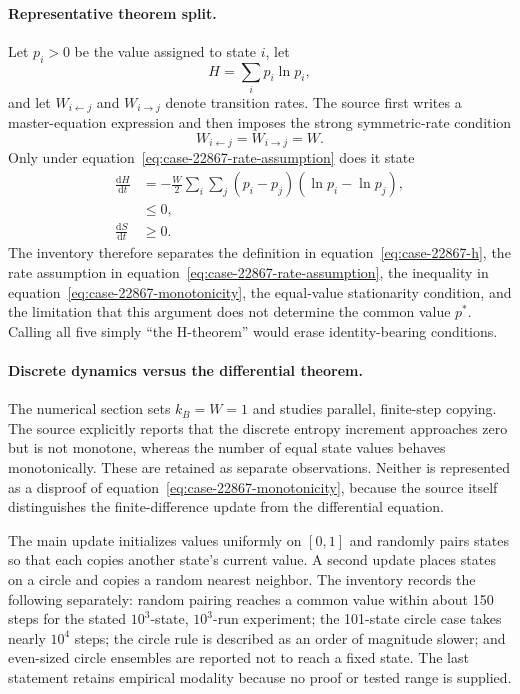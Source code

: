 \paragraph{Representative theorem split.}
Let $p_i>0$ be the value assigned to state $i$, let
\begin{equation}
H=\sum_i p_i\ln p_i,
\label{eq:case-22867-h}
\end{equation}
and let $W_{i\leftarrow j}$ and $W_{i\to j}$ denote transition rates. The source first writes a master-equation expression and then imposes the strong symmetric-rate condition
\begin{equation}
W_{i\leftarrow j}=W_{i\to j}=W.
\label{eq:case-22867-rate-assumption}
\end{equation}
Only under equation~\ref{eq:case-22867-rate-assumption} does it state
\begin{align}
\frac{\mathrm dH}{\mathrm dt}
  &=-\frac{W}{2}\sum_i\sum_j
  (p_i-p_j)(\ln p_i-\ln p_j),\\
  &\leq 0,\\
\frac{\mathrm dS}{\mathrm dt}
  &\geq 0.
\label{eq:case-22867-monotonicity}
\end{align}
The inventory therefore separates the definition in equation~\ref{eq:case-22867-h}, the rate assumption in equation~\ref{eq:case-22867-rate-assumption}, the inequality in equation~\ref{eq:case-22867-monotonicity}, the equal-value stationarity condition, and the limitation that this argument does not determine the common value $p^*$. Calling all five simply ``the H-theorem'' would erase identity-bearing conditions.

\paragraph{Discrete dynamics versus the differential theorem.}
The numerical section sets $k_B=W=1$ and studies parallel, finite-step copying. The source explicitly reports that the discrete entropy increment approaches zero but is not monotone, whereas the number of equal state values behaves monotonically. These are retained as separate observations. Neither is represented as a disproof of equation~\ref{eq:case-22867-monotonicity}, because the source itself distinguishes the finite-difference update from the differential equation.

The main update initializes values uniformly on $[0,1]$ and randomly pairs states so that each copies another state's current value. A second update places states on a circle and copies a random nearest neighbor. The inventory records the following separately: random pairing reaches a common value within about 150 steps for the stated $10^3$-state, $10^3$-run experiment; the 101-state circle case takes nearly $10^4$ steps; the circle rule is described as an order of magnitude slower; and even-sized circle ensembles are reported not to reach a fixed state. The last statement retains empirical modality because no proof or tested range is supplied.


